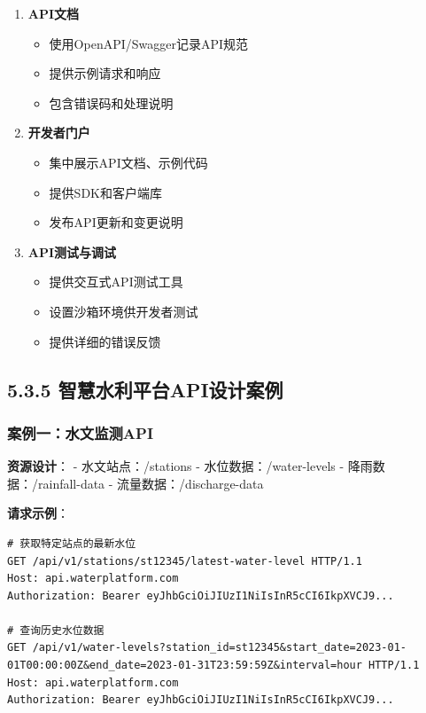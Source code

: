 \begin{enumerate}
\def\labelenumi{\arabic{enumi}.}
\tightlist
\item
  \textbf{API文档}

  \begin{itemize}
  \tightlist
  \item
    使用OpenAPI/Swagger记录API规范
  \item
    提供示例请求和响应
  \item
    包含错误码和处理说明
  \end{itemize}
\item
  \textbf{开发者门户}

  \begin{itemize}
  \tightlist
  \item
    集中展示API文档、示例代码
  \item
    提供SDK和客户端库
  \item
    发布API更新和变更说明
  \end{itemize}
\item
  \textbf{API测试与调试}

  \begin{itemize}
  \tightlist
  \item
    提供交互式API测试工具
  \item
    设置沙箱环境供开发者测试
  \item
    提供详细的错误反馈
  \end{itemize}
\end{enumerate}

\subsection{5.3.5
智慧水利平台API设计案例}\label{ux667aux6167ux6c34ux5229ux5e73ux53f0apiux8bbeux8ba1ux6848ux4f8b}

\subsubsection{案例一：水文监测API}\label{ux6848ux4f8bux4e00ux6c34ux6587ux76d1ux6d4bapi}

\textbf{资源设计}： - 水文站点：/stations - 水位数据：/water-levels -
降雨数据：/rainfall-data - 流量数据：/discharge-data

\textbf{请求示例}：

\begin{lstlisting}
# 获取特定站点的最新水位
GET /api/v1/stations/st12345/latest-water-level HTTP/1.1
Host: api.waterplatform.com
Authorization: Bearer eyJhbGciOiJIUzI1NiIsInR5cCI6IkpXVCJ9...

# 查询历史水位数据
GET /api/v1/water-levels?station_id=st12345&start_date=2023-01-01T00:00:00Z&end_date=2023-01-31T23:59:59Z&interval=hour HTTP/1.1
Host: api.waterplatform.com
Authorization: Bearer eyJhbGciOiJIUzI1NiIsInR5cCI6IkpXVCJ9...
\end{lstlisting}

